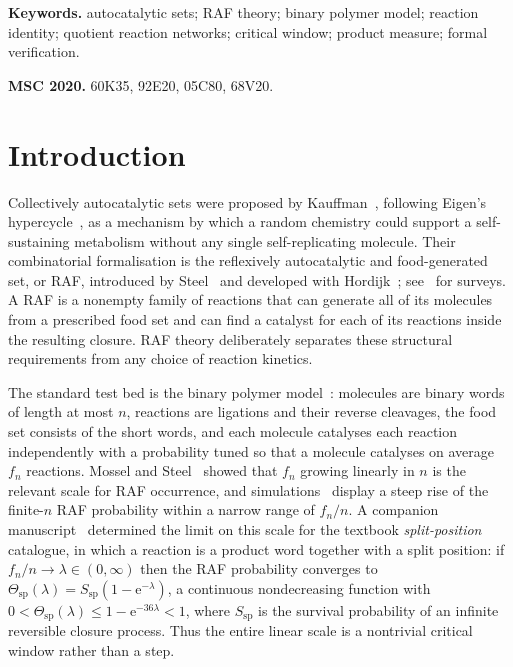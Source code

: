 \documentclass[11pt,a4paper]{article}
\theoremstyle{plain}
\theoremstyle{definition}
\theoremstyle{remark}
\newcommand{\spc}{\mathrm{sp}}
\newcommand{\ee}{\mathrm{e}}
\begin{document}
\noindent\textbf{Keywords.} autocatalytic sets; RAF theory; binary polymer model; reaction identity; quotient reaction networks; critical window; product measure; formal verification.

\medskip
\noindent\textbf{MSC 2020.} 60K35, 92E20, 05C80, 68V20.

\section{Introduction}\label{sec:intro}

Collectively autocatalytic sets were proposed by Kauffman~\cite{kauffman1986autocatalytic,kauffman1993origins}, following Eigen's hypercycle~\cite{eigen1971selforganization}, as a mechanism by which a random chemistry could support a self-sustaining metabolism without any single self-replicating molecule. Their combinatorial formalisation is the reflexively autocatalytic and food-generated set, or RAF, introduced by Steel~\cite{steel2000emergence} and developed with Hordijk~\cite{hordijk2004detecting,hordijk2012structure,hordijk2015algorithms,steel2019autocatalytic}; see~\cite{hordijk2010autocatalytic,hordijk2017chasing,hordijk2018life} for surveys. A RAF is a nonempty family of reactions that can generate all of its molecules from a prescribed food set and can find a catalyst for each of its reactions inside the resulting closure. RAF theory deliberately separates these structural requirements from any choice of reaction kinetics.

The standard test bed is the binary polymer model~\cite{kauffman1986autocatalytic,steel2000emergence,hordijk2004detecting}: molecules are binary words of length at most $n$, reactions are ligations and their reverse cleavages, the food set consists of the short words, and each molecule catalyses each reaction independently with a probability tuned so that a molecule catalyses on average $f_n$ reactions. Mossel and Steel~\cite{mossel2005random} showed that $f_n$ growing linearly in $n$ is the relevant scale for RAF occurrence, and simulations~\cite{hordijk2011required,hordijk2016variable} display a steep rise of the finite-$n$ RAF probability within a narrow range of $f_n/n$. A companion manuscript~\cite{criticalwindow2026} determined the limit on this scale for the textbook \emph{split-position} catalogue, in which a reaction is a product word together with a split position: if $f_n/n\to\lambda\in(0,\infty)$ then the RAF probability converges to $\Theta_{\spc}(\lambda)=S_{\spc}(1-\ee^{-\lambda})$, a continuous nondecreasing function with $0<\Theta_{\spc}(\lambda)\le1-\ee^{-36\lambda}<1$, where $S_{\spc}$ is the survival probability of an infinite reversible closure process. Thus the entire linear scale is a nontrivial critical window rather than a step.
\end{document}
